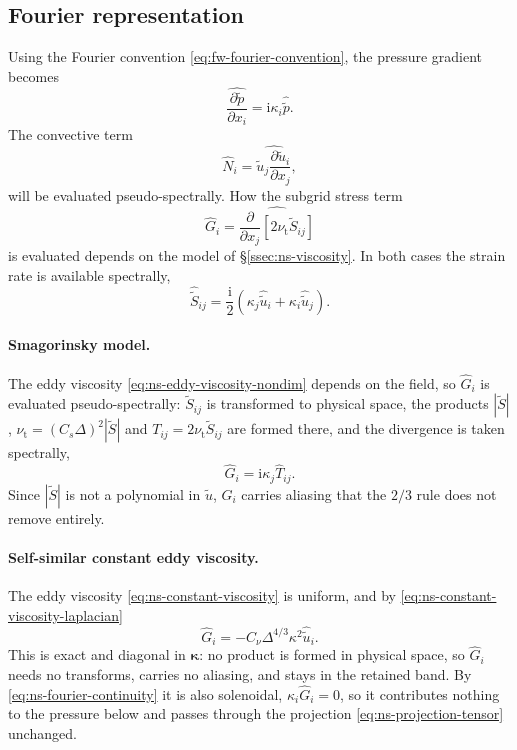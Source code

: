 \documentclass{article}
\begin{document}
\subsection{Fourier representation}\label{ssec:ns-fourier}
Using the Fourier convention \eqref{eq:fw-fourier-convention}, the pressure
gradient becomes
\begin{equation}\label{eq:ns-fourier-pressure}
  \widehat{\frac{\partial \tilde p}{\partial x_i}} = \mathrm{i} \kappa_i \hat{\tilde p}.
\end{equation}
The convective term
\begin{equation}\label{eq:ns-fourier-convection}
  \hat{N}_i = \widehat{\tilde u_j \frac{\partial \tilde u_i}{\partial x_j}},
\end{equation}
will be evaluated pseudo-spectrally. How the subgrid stress term
\begin{equation}\label{eq:ns-fourier-sgs-generic}
  \hat{G}_i = \widehat{\frac{\partial}{\partial x_j}\left[ 2 \nu_{\mathrm{t}} \tilde S_{ij} \right]}
\end{equation}
is evaluated depends on the model of \S\ref{ssec:ns-viscosity}. In both cases
the strain rate is available spectrally,
\begin{equation}\label{eq:ns-fourier-strain}
  \hat{\tilde S}_{ij} = \frac{\mathrm{i}}{2}\left( \kappa_j \hat{\tilde u}_i + \kappa_i \hat{\tilde u}_j \right).
\end{equation}

\paragraph{Smagorinsky model.} The eddy viscosity
\eqref{eq:ns-eddy-viscosity-nondim} depends on the field, so $\hat{G}_i$ is
evaluated pseudo-spectrally: $\tilde S_{ij}$ is transformed to physical space, the
products $|\tilde S|$, $\nu_{\mathrm{t}} = (C_s \Delta)^2 |\tilde S|$ and
$T_{ij} = 2 \nu_{\mathrm{t}} \tilde S_{ij}$ are formed there, and the divergence is
taken spectrally,
\begin{equation}\label{eq:ns-fourier-sgs}
  \hat{G}_i = \mathrm{i} \kappa_j \hat{T}_{ij}.
\end{equation}
Since $|\tilde S|$ is not a polynomial in $\tilde u$, $\hat{G}_i$ carries aliasing that the
$2/3$ rule does not remove entirely.

\paragraph{Self-similar constant eddy viscosity.} The eddy viscosity
\eqref{eq:ns-constant-viscosity} is uniform, and by
\eqref{eq:ns-constant-viscosity-laplacian}
\begin{equation}\label{eq:ns-fourier-sgs-constant}
  \hat{G}_i = -C_\nu \Delta^{4/3} \kappa^2 \hat{\tilde u}_i .
\end{equation}
This is exact and diagonal in $\boldsymbol{\kappa}$: no product is formed in physical
space, so $\hat{G}_i$ needs no transforms, carries no aliasing, and stays in
the retained band. By \eqref{eq:ns-fourier-continuity} it is also solenoidal,
$\kappa_i \hat{G}_i = 0$, so it contributes nothing to the pressure below and
passes through the projection \eqref{eq:ns-projection-tensor} unchanged.
\end{document}
